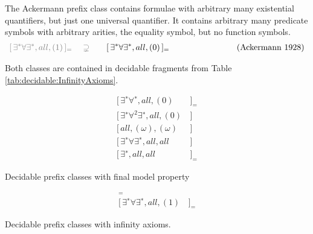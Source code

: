 \begin{example}\label{ex:ackermann}
	The Ackermann prefix class contains formulae with arbitrary many existential quantifiers, 
	but just one universal quantifier. It contains arbitrary many predicate symbols
	with arbitrary arities, the equality symbol, but no function symbols. 
	\begin{gather*}
	{\colG [\,\exists^*\forall\exists^*,all,(1)\,]_=
	\quad\supsetneq}\qquad
	[\,\exists^*\forall\exists^*,all,(0) \,]_{=}\qquad\qquad\qquad 
	\tag{Ackermann 1928}
	\end{gather*}
\end{example}

Both classes are contained in decidable fragments from Table \ref{tab:decidable:InfinityAxioms}.


\begin{table}[hbt]
	\begin{align*}
	[\,\exists^{∗}\forall^{∗}, all, (0)&\,]_{=} \tag{Bernays, Schönfinkel 1928, Ramsey 1932}
	\\
	[\,\exists^{∗}\forall^2\exists^{∗} , all, (0)&\,] \tag{Gödel 1932, Kalmár 1933, Schütte 1934}
	\\
	[\,all, (\omega), (\omega)&\,] \tag{Löb 1967, Gurevich 1969}
	\\
	[\,\exists^{∗}\forall\exists^{∗}, all, all&\,] \tag{Gurevich 1973}
	\\
	[\,\exists^{∗}, all, all&\,]_{=} \tag{Gurevich 1976}
	\end{align*}
	\caption[Decidable prefix classes]{Decidable prefix classes with final model property }
	\label{tab:decidedable:FiniteModelProperty}
\end{table}

\begin{table}[hbt]
	\begin{align*}
	[\,all, (\omega), (1)&\,]_{=} \tag{Rabin 1969} 
	\\
	[\,\exists^{∗}\forall\exists^{∗}, all, (1)&\,]_{=} \tag{Shelah 1977}
	\end{align*}
	\caption[Decidable prefix classes]{Decidable prefix classes with infinity axioms. }
	\label{tab:decidable:InfinityAxioms}
\end{table}

